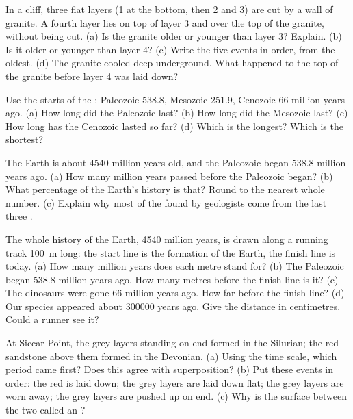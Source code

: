 \begin{exercise}[$\star\star$]\label{exo:g7:geological-time:5}
In a cliff, three flat layers (1 at the bottom, then 2 and 3) are cut by
a wall of granite. A fourth layer lies on top of layer 3 and over the
top of the granite, without being cut. (a) Is the granite older or
younger than layer 3? Explain. (b) Is it older or younger than layer 4?
(c) Write the five events in order, from the oldest. (d) The granite
cooled deep underground. What happened to the top of the granite
before layer 4 was laid down?
\end{exercise}

\begin{exercise}[$\star\star$]\label{exo:g7:geological-time:6}
Use the starts of the : Paleozoic \num{538.8}, Mesozoic \num{251.9},
Cenozoic \num{66} million years ago. (a) How long did the Paleozoic last?
(b) How long did the Mesozoic last? (c) How long has the Cenozoic lasted
so far? (d) Which  is the longest? Which is the shortest?
\end{exercise}

\begin{exercise}[$\star\star$]\label{exo:g7:geological-time:7}
The Earth is about \num{4540} million years old, and the Paleozoic began
\num{538.8} million years ago. (a) How many million years passed before
the Paleozoic began? (b) What percentage of the Earth's history is that?
Round to the nearest whole number. (c) Explain why most of the 
found by geologists come from the last three .
\end{exercise}

\begin{exercise}[$\star\star$]\label{exo:g7:geological-time:8}
The whole history of the Earth, \num{4540} million years, is drawn along
a running track \qty{100}{m} long: the start line is the formation of
the Earth, the finish line is today. (a) How many million years does
each metre stand for? (b) The Paleozoic began \num{538.8} million years
ago. How many metres before the finish line is it? (c) The dinosaurs
were gone \num{66} million years ago. How far before the finish line?
(d) Our species appeared about \num{300000} years ago. Give the
distance in centimetres. Could a runner see it?
\end{exercise}

\begin{exercise}[$\star\star$]\label{exo:g7:geological-time:9}
At Siccar Point, the grey layers standing on end formed in the Silurian;
the red sandstone above them formed in the Devonian. (a) Using the time
scale, which period came first? Does this agree with superposition?
(b) Put these events in order: the red  is laid down; the grey
layers are laid down flat; the grey layers are worn away; the grey
layers are pushed up on end. (c) Why is the surface between the two
 called an ?
\end{exercise}

